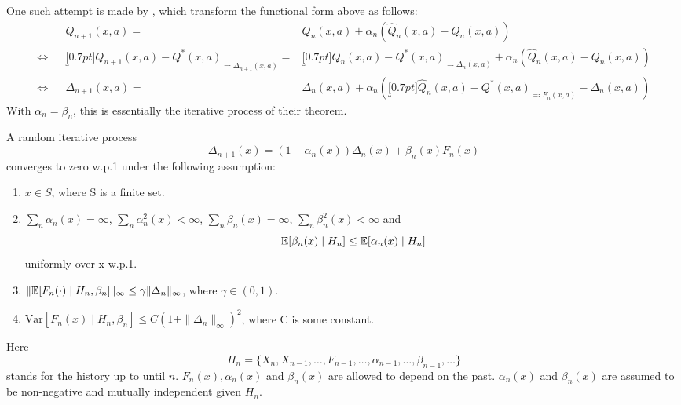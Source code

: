 One such attempt is made by \textcite{jaakkolaConvergenceStochasticIterative1994a}, which transform the functional form above as follows:
\begin{align*}
    &&Q_{n+1}(x,a)
    =&Q_n(x,a) + \alpha_n(\hat{Q}_n (x,a)-Q_n(x,a))
    \\
    \iff
    && \underbracket[0.7pt]{Q_{n+1}(x,a) -Q^*(x,a)}_{\eqqcolon\Delta_{n+1}(x,a)} 
    =&\underbracket[0.7pt]{Q_n(x,a)-Q^*(x,a) }_{\eqqcolon\Delta_n(x,a)}
    + \alpha_n(\hat{Q}_n (x,a)-Q_n(x,a))\\
    \iff&& \Delta_{n+1}(x,a) =&\Delta_n(x,a) +\alpha_n 
    (\underbracket[0.7pt]{\hat{Q}_n (x,a)-Q^*(x,a)}_{
        \eqqcolon F_n(x,a)
    }-\Delta_n(x,a))
\end{align*}
With \(\alpha_n=\beta_n\), this is essentially the iterative process of their theorem.

\begin{thm}\label{JAAKKOLA:THM}
    A random iterative process
    \[
        \Delta_{n+1}(x)=(1-\alpha_n(x)) \Delta_n(x) +\beta_n(x) F_n(x)
    \]
    converges to zero w.p.1 under the following assumption:
    \begin{enumerate}
        \item\label{Jaakkola:1} \(x\in S\), where S is a finite set.
        \item\label{Jaakkola:2} \(\sum_n \alpha_n(x)=\infty\), \(\sum_n \alpha_n^2(x) <\infty\), \(\sum_n\beta_n(x)=\infty\), \(\sum_n \beta_n^2 (x)<\infty\) and
        \[
            \mathbb{E}[\beta_n(x)\mid H_n]\le \mathbb{E}[\alpha_n(x)\mid H_n]
        \]
        uniformly over x w.p.1.
        \item\label{Jaakkola:3} \(\|\mathbb{E}[F_n(\cdot)\mid H_n,\beta_n]\|_\infty \le \gamma \|\Delta_n\|_\infty\), where \(\gamma \in (0,1) \).
        \item\label{Jaakkola:4} \(\text{Var}[F_n(x)\mid H_n,\beta_n]\le C(1+\|\Delta_n\|_\infty)^2\), where C is some constant.
    \end{enumerate}
    Here
    \[
        H_n=\{X_n, X_{n-1}, \dots, F_{n-1}, \dots, \alpha_{n-1},\dots, \beta_{n-1},\dots\}
    \]
    stands for the history up to until \(n\). \(F_n(x), \alpha_n(x)\) and \(\beta_n(x)\) are allowed to depend on the past. \(\alpha_n(x)\) and \(\beta_n(x)\) are assumed to be non-negative and mutually independent given \(H_n\).
\end{thm}

